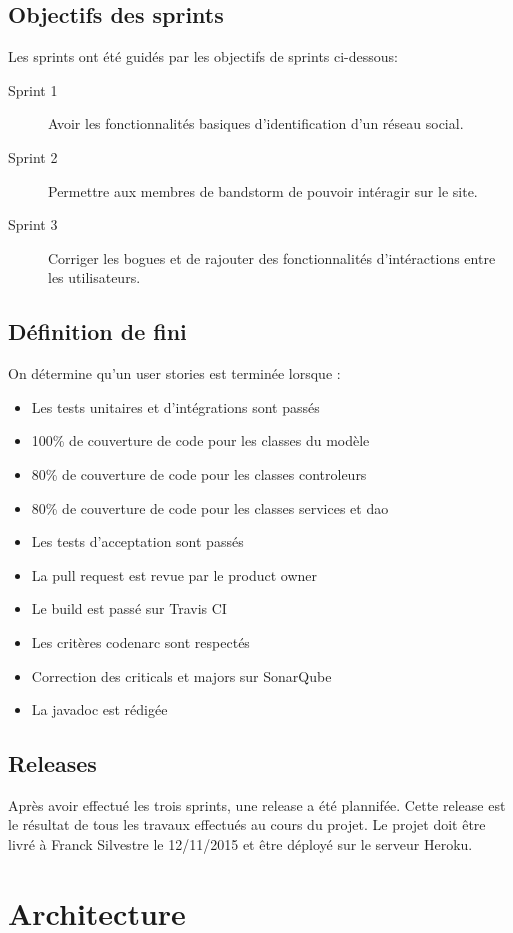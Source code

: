 \documentclass[12pt,a4paper,oneside]{book}
\begin{document}
	\section{Objectifs des sprints}
	Les sprints ont été guidés par les objectifs de sprints ci-dessous:

\begin{description}
	\item[Sprint 1] Avoir les fonctionnalités basiques d’identification d’un réseau social. 
	\item[Sprint 2] Permettre aux membres de bandstorm de pouvoir intéragir sur le site.
	\item[Sprint 3] Corriger les bogues et de rajouter des fonctionnalités d'intéractions entre les utilisateurs. 
\end{description}

	\section{Définition de fini}
	On détermine qu'un user stories est terminée lorsque : 

	\begin{itemize}
		\item Les tests unitaires et d’intégrations sont passés
		\item 100\% de couverture de code pour les classes du modèle
		\item 80\% de couverture de code pour les classes controleurs
		\item 80\% de couverture de code pour les classes services et dao
		\item Les tests d’acceptation sont passés
		\item La pull request est revue par le product owner
		\item Le build est passé sur Travis CI
		\item Les critères codenarc sont respectés 
		\item Correction des criticals et majors sur SonarQube
		\item La javadoc est rédigée 
	\end{itemize}

	\section{Releases}
	Après avoir effectué les trois sprints, une release a été plannifée. Cette release est le résultat de tous les travaux
	effectués au cours du projet. Le projet doit être livré à Franck Silvestre le 12/11/2015 et être déployé sur le serveur Heroku.

	
	\chapter{Architecture}
\end{document}

